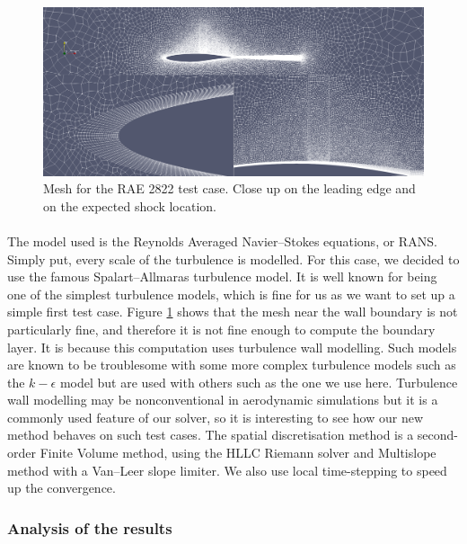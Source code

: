         \begin{figure}
          \centering
          \includegraphics[width=\textwidth]{figures/rae_mesh.png}
          \caption{Mesh for the RAE 2822 test case. Close up on the leading edge and on the expected shock location.}
          \label{fig:rae_mesh}
        \end{figure}

        \paragraph{}
        The model used is the Reynolds Averaged Navier--Stokes equations, or RANS.
        Simply put, every scale of the turbulence is modelled.
        For this case, we decided to use the famous Spalart--Allmaras turbulence model.
        It is well known for being one of the simplest turbulence models, which is fine for us as we want to set up a simple first test case.
        Figure \ref{fig:rae_mesh} shows that the mesh near the wall boundary is not particularly fine, and therefore it is not fine enough to compute the boundary layer.
        It is because this computation uses turbulence wall modelling.
        Such models are known to be troublesome with some more complex turbulence models such as the $k-\epsilon$ model but are used with others such as the one we use here.
        Turbulence wall modelling may be nonconventional in aerodynamic simulations but it is a commonly used feature of our solver, so it is interesting to see how our new method behaves on such test cases.
        The spatial discretisation method is a second-order Finite Volume method, using the HLLC Riemann solver and Multislope method with a Van--Leer slope limiter.
        We also use local time-stepping to speed up the convergence.


      \subsubsection{Analysis of the results}

